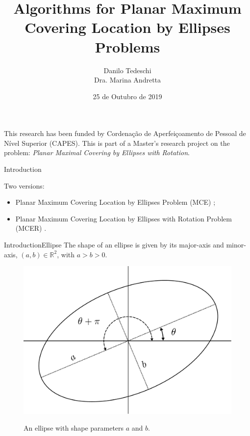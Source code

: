 \documentclass{beamer}
\author{Danilo Tedeschi\\Dra. Marina Andretta}
\title{Algorithms for Planar Maximum Covering Location by Ellipses Problems}
\institute{Universidade de São Paulo}
\date{25 de Outubro de 2019}
\begin{document}
	
	\begin{frame}[t,plain]
		\titlepage
		
		\footnotesize This research has been funded by Cordenação de Aperfeiçoamento de Pessoal de Nível Superior (CAPES). This is part of a Master's research project on the problem: \textit{Planar Maximal Covering by Ellipses with Rotation}.
	\end{frame}
	
\begin{frame}{Introduction}
	
	Two versions: 
	\begin{itemize}
		\item Planar Maximum Covering Location by Ellipses Problem (MCE) \cite{canbolat};
		\item Planar Maximum Covering Location by Ellipses with Rotation Problem (MCER) \cite{andreta}.
	\end{itemize}
\end{frame}

\begin{frame}{Introduction}{Ellipse}
	The shape of an ellipse is given by its major-axis and minor-axis, $(a, b) \in \mathbb{R}^2$, with $a > b > 0$.
	
	\begin{figure}[H]
		\centering
		
		\includegraphics[scale=.3]{../tex/figures/rotated_ellipse.pdf}
		\label{fig:ellipse_params}
		\caption{An ellipse with shape parameters $a$ and $b$.}
	\end{figure}
	
\end{frame}
\end{document}
